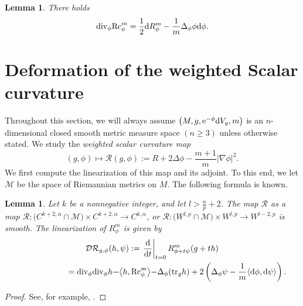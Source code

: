 \documentclass[pdftex]{sigma}
\numberwithin{equation}{section}
\newtheorem{Lemma}[Theorem]{Lemma}
\begin{document}
\begin{Lemma}\label{bianchi}
There holds
 \begin{equation*}%
 {\rm div}_\phi {\rm Rc}_\phi^m=\frac{1}{2}{\rm d}R_\phi^m-\frac{1}{m}\Delta_\phi\phi {\rm d}\phi.
 \end{equation*}
\end{Lemma}

\section{Deformation of the weighted Scalar curvature}\label{sec3}

Throughout this section, we will always assume $\bigl(M,g,{\rm e}^{-\phi}{\rm d}V_g,m\bigr)$ is an $n$-dimensional closed smooth metric measure space $(n\geq3)$ unless otherwise stated.
We study the \textit{weighted scalar curvature map}
\[(g,\phi)\mapsto \mathcal{R}(g,\phi):=R+2\Delta \phi -\frac{m+1}{m} |\nabla \phi |^2.\]
We first compute the linearization of this map and its adjoint.
To this end, we let $\mathcal{M}$ be the space of Riemannian metrics on $M$.
The following formula is known.

\begin{Lemma}\label{lem3.1}
Let $k$ be a nonnegative integer, and let $l>\frac{n}{p}+2$. The map $\mathcal{R}$ as a map $\mathcal{R}\colon\bigl(C^{k+2,\alpha}\cap \mathcal{M}\bigr)\times C^{k+2,\alpha}\to C^{k,\alpha}$, or $\mathcal{R}\colon\bigl(W^{l,p}\cap \mathcal{M}\bigr)\times W^{l,p}\to W^{l-2,p}$ is smooth. The linearization of $R_\phi^m$ is given by
\begin{gather*}
\mathcal{DR}_{g,\phi}(h,\psi):=\left.\frac{{\rm d}}{{\rm d}t}\right|_{t=0}R_{\phi+t\psi}^m(g+th)\\
\hphantom{\mathcal{DR}_{g,\phi}(h,\psi):}={\rm div}_\phi {\rm div}_\phi h-\bigr\langle h,{\rm Rc}_\phi^m\bigl\rangle -\Delta_\phi({\rm tr}_gh)+2\left(\Delta_\phi \psi-\frac{1}{m}\langle {\rm d}\phi,{\rm d}\psi\rangle\right).
\end{gather*}
\end{Lemma}
\begin{proof}
See, for example, \cite[Proposition 5.1]{Case2}.
\end{proof}
\end{document}
